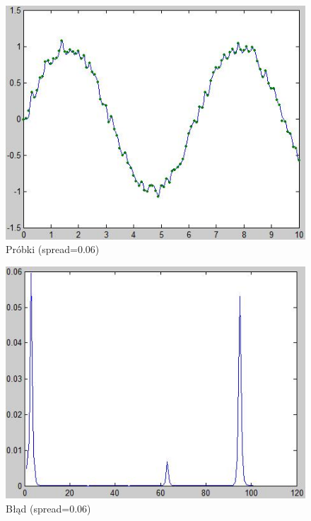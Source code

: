 \begin{figure}[!h]
\centering
\includegraphics[scale=0.8]{src/0_06_wykres.png}\caption{\label{fig:0.06_wykres}Próbki (spread=0.06)}
\end{figure}

\begin{figure}[!h]
\centering
\includegraphics[scale=0.8]{src/0_06_blad.png}\caption{\label{fig:0.06_blad}Błąd (spread=0.06)}
\end{figure}

